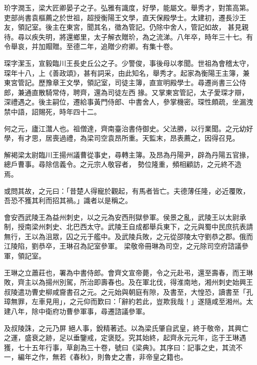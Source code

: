 \begin{pinyinscope}
 玠字潤玉，梁大匠卿晏子之子。弘雅有識度，好學，能屬文。舉秀才，對策高第。吏部尚書袁樞薦之於世祖，超授衡陽王文學，直天保殿學士。太建初，遷長沙王友，領記室。後主在東宮，聞其名，徵為管記。仍除中舍人，管記如故，
 甚見親待。尋以疾失明，將還鄉里，太子解衣贈玠，為之流涕。八年卒，時年三十七。有令舉哀，并加賵贈。至德二年，追贈少府卿。有集十卷。



 琛字潔玉，宣毅臨川王長史丘公之子。少警俊，事後母以孝聞。世祖為會稽太守，琛年十八，上《善政頌》，甚有詞采，由此知名，舉秀才。起家為衡陽王主簿，兼東宮管記。歷豫章王文學，領記室，司徒主簿，直宣明殿學士。尋遷尚書三公侍郎，兼通直散騎常侍，聘齊，還為司徒左西
 掾。又掌東宮管記，太子愛琛才辯，深禮遇之。後主嗣位，遷給事黃門侍郎、中書舍人，參掌機密。琛性頗疏，坐漏洩禁中語，詔賜死，時年四十二。



 何之元，廬江灊人也。祖僧達，齊南臺治書侍御史。父法勝，以行業聞。之元幼好學，有才思，居喪過禮，為梁司空袁昂所重。天監末，昂表薦之，因得召見。



 解褐梁太尉臨川王揚州議曹從事史，尋轉主簿。及昂為丹陽尹，辟為丹陽五官掾，總戶曹事。尋除信義令。之元宗人敬容者，
 勢位隆重，頻相顧訪，之元終不造焉。



 或問其故，之元曰：「昔楚人得寵於觀起，有馬者皆亡。夫德薄任隆，必近覆敗，吾恐不獲其利而招其禍。」識者以是稱之。



 會安西武陵王為益州刺史，以之元為安西刑獄參軍。侯景之亂，武陵王以太尉承制，授南梁州刺史、北巴西太守。武陵王自成都舉兵東下，之元與蜀中民庶抗表請無行，王以為沮眾，囚之元于艦中。及武陵兵敗，之元從邵陵太守劉恭之郡。俄而江陵陷，劉恭卒，王琳召為記室參軍。
 梁敬帝冊琳為司空，之元除司空府諮議參軍，領記室。



 王琳之立蕭莊也，署為中書侍郎。會齊文宣帝薨，令之元赴弔，還至壽春，而王琳敗，齊主以為揚州別駕，所治即壽春也。及在軍北伐，得淮南地，湘州刺史始興王叔陵遣功曹史柳咸齎書召之元。之元始與朝庭有隙，及書至，大惶恐，讀書至「孔璋無罪，左車見用」，之元仰而歎曰：「辭約若此，豈欺我哉！」遂隨咸至湘州。太建八年，除中衛府功曹參軍事，尋遷諮議參軍。



 及叔陵誅，之元乃屏
 絕人事，銳精著述。以為梁氏肇自武皇，終于敬帝，其興亡之運，盛衰之跡，足以垂鑒戒，定褒貶。究其始終，起齊永元元年，迄于王琳遇獲，七十五年行事，草創為三十卷，號曰《梁典》。其序曰：記事之史，其流不一，編年之作，無若《春秋》，則魯史之書，非帝皇之籍也。




\end{pinyinscope}
